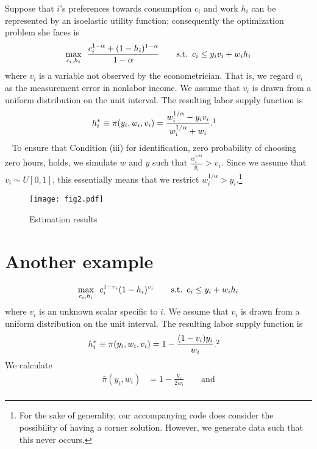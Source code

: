 \documentclass[11pt,letterpaper]{article}                  %
\begin{document}
Suppose that $i$'s preferences towards consumption $c_i$ and work $h_i$ can be represented by an isoelastic utility function; consequently the optimization problem she faces is 
\begin{align*}
	\max_{c_i, h_i} \enskip \frac{c_i^{1-\alpha} + (1-h_i)^{1-\alpha}}{1-\alpha} \qquad \text{s.t.} \enskip c_i \leq y_i v_i + w_i h_i
\end{align*}
where $v_i$ is a variable not observed by the econometrician.
That is, we regard $v_i$ as the measurement error in nonlabor income.
We assume that $v_i$ is drawn from a uniform distribution on the unit interval.
The resulting labor supply function is
\begin{align*}
	h_i^* &\equiv \pi (y_i, w_i, v_i) = \frac{w_i^{1/\alpha} - y_i v_i}{w_i^{1/\alpha} + w_i}.\footnotemark
\end{align*}\
To ensure that Condition (iii) for identification, zero probability of choosing zero hours, holds, we simulate $w$ and $y$ such that $\frac{w_i^{1/\alpha}}{y_i} > v_i$.
Since we assume that $v_i \sim U[0, 1]$, this essentially means that we restrict $w_i^{1/\alpha} > y_i$.\footnote{For the sake of generality, our accompanying code does consider the possibility of having a corner solution. However, we generate data such that this never occurs.}

\begin{figure}[H]
	\centering
	\caption{Estimation results}
	\label{fig:est1}
	\texttt{[image: fig2.pdf]}
\end{figure}


\section{Another example}
\label{sec:ex2}

\begin{align*}
	\max_{c_i, h_i} \enskip c_i^{1-v_i} (1-h_i)^{v_i} \qquad \text{s.t.} \enskip c_i \leq y_i + w_i h_i
\end{align*}
where $v_i$ is an unknown scalar specific to $i$.
We assume that $v_i$ is drawn from a uniform distribution on the unit interval.
The resulting labor supply function is
\begin{align*}
	h^*_i &\equiv \pi (y_i, w_i, v_i) = 1 - \frac{(1-v_i) y_i}{w_i}.\footnotemark
\end{align*}
We calculate
\begin{align*}
	\bar{\pi} (y_i, w_i) &= 1 - \frac{y_i}{2 w_i} \qquad \text{and} \\
\end{align*}
\end{document}
